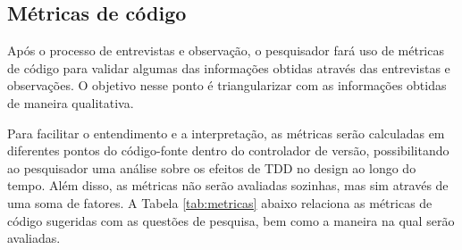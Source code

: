 \subsection{Métricas de código}
\label{sec:planejamento-metricas}

Após o processo de entrevistas e observação, o pesquisador fará uso de métricas
de código para validar algumas das informações obtidas através das entrevistas e
observações. O objetivo nesse ponto é triangularizar com as informações obtidas
de maneira qualitativa. 

Para facilitar o entendimento e a interpretação, as métricas
serão calculadas em diferentes pontos do código-fonte dentro do controlador de versão,
possibilitando ao pesquisador uma análise sobre os efeitos de TDD no design ao
longo do tempo. Além disso, as métricas não serão avaliadas sozinhas, mas sim
através de uma soma de fatores. 
A Tabela \ref{tab:metricas} abaixo relaciona as métricas de código sugeridas com
as questões de pesquisa, bem como a maneira na qual serão avaliadas.

